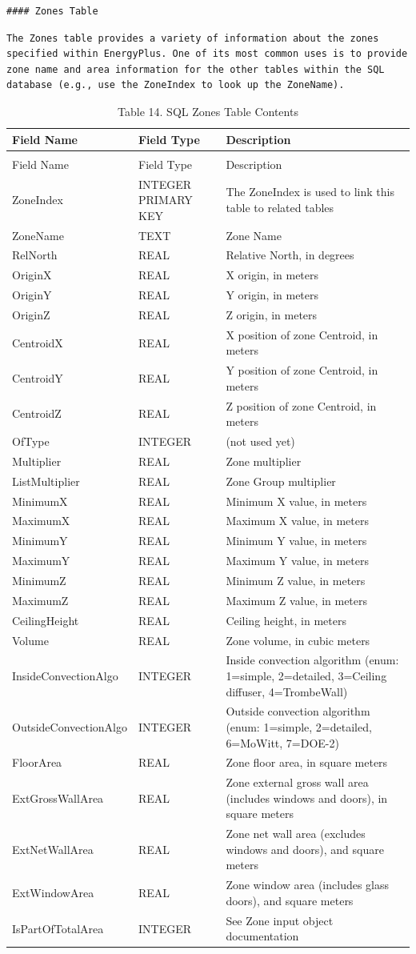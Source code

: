 \begin{lstlisting}
#### Zones Table
\end{lstlisting}

\begin{lstlisting}
The Zones table provides a variety of information about the zones specified within EnergyPlus. One of its most common uses is to provide zone name and area information for the other tables within the SQL database (e.g., use the ZoneIndex to look up the ZoneName).
\end{lstlisting}

\begin{longtable}[c]{p{1.5in}p{1.5in}p{3.0in}}
\caption{Table 14. SQL Zones Table Contents \label{table:table-14.-sql-zones-table-contents}} \tabularnewline
\toprule 
Field Name & Field Type & Description \tabularnewline
\midrule
\endfirsthead

\caption[]{Table 14. SQL Zones Table Contents} \tabularnewline
\toprule 
Field Name & Field Type & Description \tabularnewline
\midrule
\endhead

ZoneIndex & INTEGER PRIMARY KEY & The ZoneIndex is used to link this table to related tables \tabularnewline
ZoneName & TEXT & Zone Name \tabularnewline
RelNorth & REAL & Relative North, in degrees \tabularnewline
OriginX & REAL & X origin, in meters \tabularnewline
OriginY & REAL & Y origin, in meters \tabularnewline
OriginZ & REAL & Z origin, in meters \tabularnewline
CentroidX & REAL & X position of zone Centroid, in meters \tabularnewline
CentroidY & REAL & Y position of zone Centroid, in meters \tabularnewline
CentroidZ & REAL & Z position of zone Centroid, in meters \tabularnewline
OfType & INTEGER & (not used yet) \tabularnewline
Multiplier & REAL & Zone multiplier \tabularnewline
ListMultiplier & REAL & Zone Group multiplier \tabularnewline
MinimumX & REAL & Minimum X value, in meters \tabularnewline
MaximumX & REAL & Maximum X value, in meters \tabularnewline
MinimumY & REAL & Minimum Y value, in meters \tabularnewline
MaximumY & REAL & Maximum Y value, in meters \tabularnewline
MinimumZ & REAL & Minimum Z value, in meters \tabularnewline
MaximumZ & REAL & Maximum Z value, in meters \tabularnewline
CeilingHeight & REAL & Ceiling height, in meters \tabularnewline
Volume & REAL & Zone volume, in cubic meters \tabularnewline
InsideConvectionAlgo & INTEGER & Inside convection algorithm (enum: 1=simple, 2=detailed, 3=Ceiling diffuser, 4=TrombeWall) \tabularnewline
OutsideConvectionAlgo & INTEGER & Outside convection algorithm (enum: 1=simple, 2=detailed, 6=MoWitt, 7=DOE-2) \tabularnewline
FloorArea & REAL & Zone floor area, in square meters \tabularnewline
ExtGrossWallArea & REAL & Zone external gross wall area (includes windows and doors), in square meters \tabularnewline
ExtNetWallArea & REAL & Zone net wall area (excludes windows and doors), and square meters \tabularnewline
ExtWindowArea & REAL & Zone window area (includes glass doors), and square meters \tabularnewline
IsPartOfTotalArea & INTEGER & See Zone input object documentation \tabularnewline
\bottomrule
\end{longtable}

